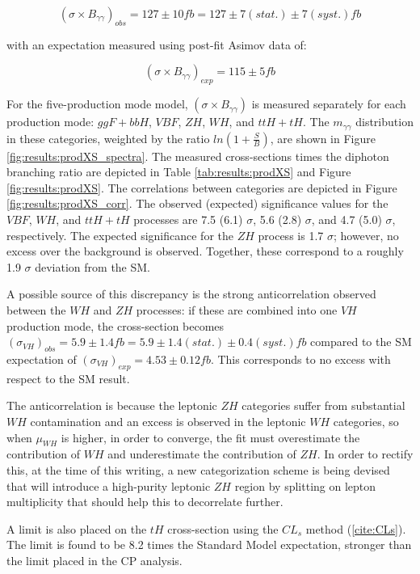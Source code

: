 \begin{equation}
(\sigma \times B_{\gamma \gamma})_{obs} =127 \pm 10 fb=127 \pm 7(stat.) \pm 7(syst.)fb
\end{equation}

with an expectation measured using post-fit Asimov data of:

\begin{equation}
(\sigma \times B_{\gamma \gamma})_{exp} =115 \pm 5 fb
\end{equation}

For the five-production mode model, $(\sigma \times B_{\gamma \gamma})$ is measured separately for each production mode: $ggF+bbH$, $VBF$, $ZH$, $WH$, and $ttH+tH$. The $m_{\gamma\gamma}$ distribution in these categories, weighted by the ratio $ln(1+\frac{S}{B})$, are shown in Figure \ref{fig:results:prodXS_spectra}. The measured cross-sections times the diphoton branching ratio are depicted in Table \ref{tab:results:prodXS} and Figure \ref{fig:results:prodXS}. The correlations between categories are depicted in Figure \ref{fig:results:prodXS_corr}. The observed (expected) significance values for the $VBF$, $WH$, and $ttH+tH$ processes are 7.5 (6.1) $\sigma$, 5.6 (2.8) $\sigma$, and 4.7 (5.0) $\sigma$, respectively. The expected significance for the $ZH$ process is 1.7 $\sigma$; however, no excess over the background is observed. Together, these correspond to a roughly 1.9 $\sigma$ deviation from the SM.

A possible source of this discrepancy is the strong anticorrelation observed between the $WH$ and $ZH$ processes: if these are combined into one $VH$ production mode, the cross-section becomes $(\sigma_{VH})_{obs} = 5.9 \pm 1.4fb = 5.9 \pm 1.4(stat.) \pm 0.4(syst.)fb$ compared to the SM expectation of $(\sigma_{VH})_{exp}=4.53 \pm 0.12fb$. This corresponds to no excess with respect to the SM result.

The anticorrelation is because the leptonic $ZH$ categories suffer from substantial $WH$ contamination and an excess is observed in the leptonic $WH$ categories, so when $\mu_{WH}$ is higher, in order to converge, the fit must overestimate the contribution of $WH$ and underestimate the contribution of $ZH$. In order to rectify this, at the time of this writing, a new categorization scheme is being devised that will introduce a high-purity leptonic $ZH$ region by splitting on lepton multiplicity that should help this to decorrelate further.

A limit is also placed on the $tH$ cross-section using the $CL_{s}$ method (\ref{cite:CLs}). The limit is found to be 8.2 times the Standard Model expectation, stronger than the limit placed in the CP analysis. 



